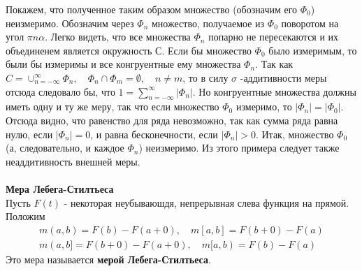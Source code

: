 \documentclass{article}
\begin{document}
	Покажем, что полученное таким образом множество (обозначим его  $\Phi_{0}$)  неизмеримо. Обозначим через  $\Phi_{n}$  множество, получаемое из $\Phi_{0}$ поворотом на угол $\pi n\alpha $. Легко видеть, что все множества  $\Phi_{n}$ попарно не пересекаются и их объединенем является окружность $С$. Если бы множество $\Phi_{0}$ было измеримым, то были бы измеримы и все конгруентные ему множества $\Phi_{n}$. Так как$C=\cup_{n=-\infty}^{\infty} \Phi_{n}, \quad \Phi_{n} \cap \Phi_{m}=\emptyset, \quad n \neq m$, то в силу $\sigma$  -аддитивности меры отсюда следовало бы, что $1=\sum_{n=-\infty}^{\infty}\left|\Phi_{n}\right|$.	Но конгруентные множества должны иметь одну и ту же меру, так что если множество $\Phi_{0}$ измеримо, то $\left|\Phi_{n}\right|=\left|\Phi_{0}\right|$. Отсюда видно, что равенство для ряда невозможно, так как сумма ряда равна нулю, если $\left|\Phi_{n}\right|=0$,  и равна бесконечности, если $\left|\Phi_{n}\right|>0$. Итак, множество $\Phi_{0}$(а, следовательно, и каждое $\Phi_{n}$)  неизмеримо. Из этого примера следует также неаддитивность внешней меры.\\
	\\
	
	\textbf{Мера Лебега-Стилтьеса}\\
	Пусть $F(t)$ -  некоторая неубываюшдя, непрерывная слева функция на прямой. Положим
	\begin{eqnarray*}
		m(a, b)=F(b)-F(a+0), \quad m[a, b]=F(b+0)-F(a) \\
		m(a, b]=F(b+0)-F(a+0), \quad m[a, b)=F(b)-F(a)
	\end{eqnarray*}
  	Это мера называется \textbf{мерой Лебега-Стилтьеса}.
	
\end{document}

